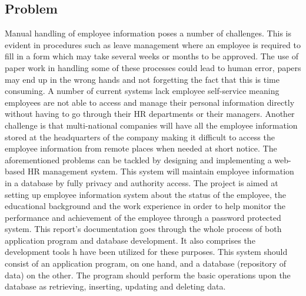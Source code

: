 \subsection{Problem}
Manual handling of employee information poses a number of challenges. This is evident in procedures such as leave management where an employee is required to fill in a form which may take several weeks or months to be approved. The use of paper work in handling some of these processes could lead to human error, papers may end up in the wrong hands and not forgetting the fact that this is time consuming. A number of current systems lack employee self-service meaning employees are not able to access and manage their personal information directly without having to go through their HR departments or their managers. Another challenge is that multi-national companies will have all the employee information stored at the headquarters of the company making it difficult to access the employee information from remote places when needed at short notice. The aforementioned problems can be tackled by designing and implementing a web-based HR management system. This system will maintain employee information in a database by fully privacy and authority access. The project is aimed at setting up employee information system about the status of the employee, the educational background and the work experience in order to help monitor the performance and achievement of the employee through a password protected system. This report’s documentation goes through the whole process of both application program and database development. It also comprises the development tools h have been utilized for these purposes. This system should consist of an application program, on one hand, and a database (repository of data) on the other. The program should perform the basic operations upon the database as retrieving, inserting, updating and deleting data.
